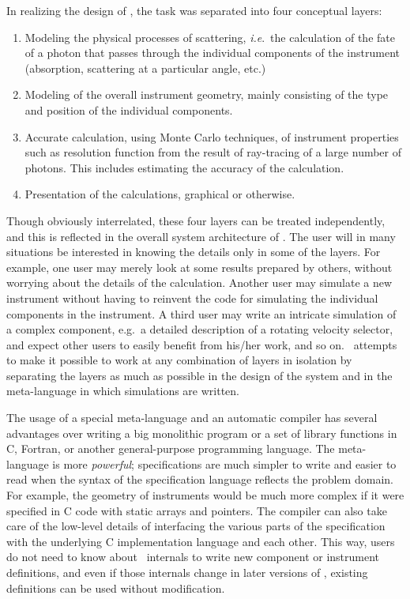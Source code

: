 In realizing the design of \MCX, the task was
separated into four conceptual layers:
\begin{enumerate}
\item Modeling the physical processes of scattering, \textit{i.e}.\
  the calculation of the fate of a photon that passes through the
  individual components of the instrument (absorption, scattering at a
  particular angle, etc.)
\item Modeling of the overall instrument geometry, mainly consisting
  of the type and position of the individual components.
\item Accurate calculation, using Monte Carlo techniques, of
  instrument properties such as resolution function from the result of
  ray-tracing of a large number of photons. This includes estimating
  the accuracy of the calculation.
\item Presentation of the calculations, graphical or otherwise.
\end{enumerate}

Though obviously interrelated, these four layers can be
treated independently, and this is reflected in the overall system
architecture of \MCX. The user will in many situations be
interested in knowing the details only in some of the layers. For
example, one user may merely look at some results prepared by others,
without worrying about the details of the calculation. Another user
may simulate a new instrument without having to reinvent the
code for simulating the individual components in the instrument. A third
user may write an intricate simulation of a complex component,
e.g.\ a detailed description of a rotating velocity selector,
and expect other users to easily
benefit from his/her work, and so on. \MCX\ attempts to make it
possible to work at any combination of layers in isolation by separating
the layers as much as possible in the design of the system and in
the meta-language in which simulations are written.

The usage of a special meta-language and an automatic compiler has
several advantages over writing a big monolithic program or a set of
library functions in C, Fortran, or another general-purpose programming
language.  The meta-language is more \textit{powerful}; specifications
are much simpler to write and easier to read when the syntax of the
specification language reflects the problem domain. For example, the
geometry of instruments would be much more complex if it were specified
in C code with static arrays and pointers. The compiler can also take
care of the low-level details of interfacing the various parts of the
specification with the underlying C implementation language and each
other. This way, users do not need to know about \MCX\ internals to
write new component or instrument definitions, and even if those
internals change in later versions of \MCX, existing definitions can be
used without modification.

